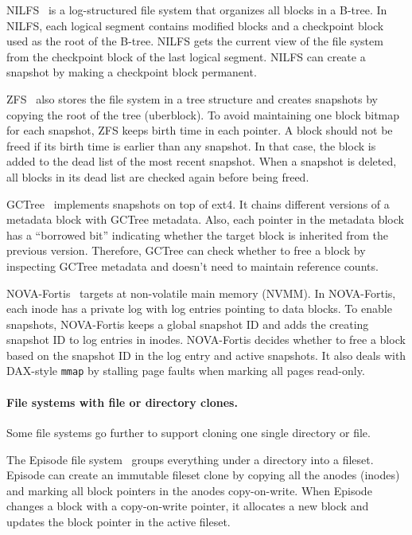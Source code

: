 NILFS~\cite{nilfs2} is a log-structured file system that organizes all blocks
in a B-tree.
In NILFS, each logical segment contains modified blocks and a checkpoint block
used as the root of the B-tree.
NILFS gets the current view of the file system from the checkpoint block
of the last logical segment.
NILFS can create a snapshot by making a checkpoint block permanent.

ZFS~\cite{zfs} also stores the file system in a tree structure and creates
snapshots by copying the root of the tree (uberblock).
To avoid maintaining one block bitmap for each snapshot, ZFS keeps birth time
in each pointer.
A block should not be freed if its birth time is earlier than any snapshot.
In that case, the block is added to the dead list of the most recent snapshot.
When a snapshot is deleted, all blocks in its dead list are checked again before
being freed.

GCTree~\cite{gctree} implements snapshots on top of ext4.
It chains different versions of a metadata block with GCTree metadata.
Also, each pointer in the metadata block has a ``borrowed bit'' indicating
whether the target block is inherited from the previous version.
Therefore, GCTree can check whether to free a block by inspecting GCTree
metadata and doesn't need to maintain reference counts.

NOVA-Fortis~\cite{nova} targets at non-volatile main memory (NVMM).
In NOVA-Fortis, each inode has a private log with log entries pointing
to data blocks.
To enable snapshots, NOVA-Fortis keeps a global snapshot ID and adds the
creating snapshot ID to log entries in inodes.
NOVA-Fortis decides whether to free a block based on the snapshot ID in the log
entry and active snapshots.
It also deals with DAX-style \texttt{mmap} by stalling page faults when marking
all pages read-only.

\paragraph{File systems with file or directory clones.}

Some file systems go further to support cloning one single directory or file.

The Episode file system~\cite{episode} groups everything under a directory into
a fileset.
Episode can create an immutable fileset clone by copying all the anodes (inodes)
and marking all block pointers in the anodes copy-on-write.
When Episode changes a block with a copy-on-write pointer, it allocates a new
block and updates the block pointer in the active fileset.

